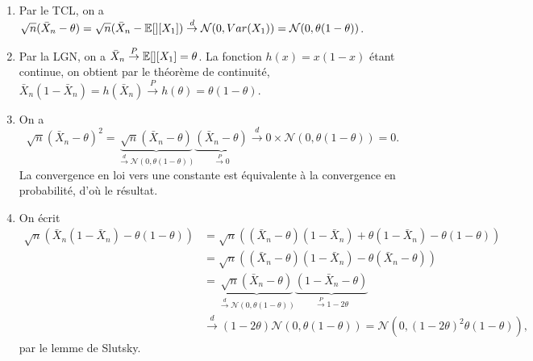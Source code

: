\begin{solution}
  \begin{enumerate}
    \item Par le TCL, on a $\sqrt{n} ( \bar{X}_n - \theta)=\sqrt{n} ( \bar{X}_n -
            \mathbb{E}[][X_1]) \overset{d}{\rightarrow} \mathcal N(0,Var(X_1))=\mathcal N
            (0,\theta(1-\theta))$.
    \item Par la LGN, on a $\bar{X}_n \overset{P}{\rightarrow}\mathbb{E}[][X_1]=\theta$.
          La fonction $h(x)=x(1-x)$ \'etant continue, on obtient par le th\'eor\`eme de
          continuit\'e, $\bar{X}_n(1-\bar{X}_n)=h(\bar{X}_n)\overset{P}{\rightarrow}
            h(\theta)=\theta(1-\theta)$.
    \item On a $$\sqrt{n} ( \bar{X}_n - \theta)^2= \underbrace{\sqrt{n} ( \bar{X}_n -
              \theta)}_{\overset{d}{\rightarrow} \mathcal N
              (0,\theta(1-\theta))}\underbrace{( \bar{X}_n -
              \theta)}_{\overset{P}{\rightarrow} 0} \overset{d}{\rightarrow} 0\times \mathcal
            N (0,\theta(1-\theta))=0. $$ La convergence en loi vers une constante est
          \'equivalente \`a la convergence en probabilit\'e, d'o\`u le r\'esultat.
    \item On \'ecrit
          \begin{align*}
            \sqrt{n} \left( \bar{X}_n (1 - \bar{X}_n) - \theta(1-\theta) \right)
             & = \sqrt{n} \left( (\bar{X}_n-\theta) (1 - \bar{X}_n)+\theta(1 - \bar{X}_n) - \theta(1-\theta) \right)                                                                            \\
             & = \sqrt{n} \left( (\bar{X}_n-\theta) (1 - \bar{X}_n)-\theta( \bar{X}_n -\theta) \right)                                                                                          \\
             & = \underbrace{\sqrt{n}   (\bar{X}_n-\theta)}_{\overset{d}{\rightarrow} \mathcal N (0,\theta(1-\theta))} \underbrace{(1 - \bar{X}_n-\theta)}_{\overset{P}{\rightarrow} 1-2\theta} \\
             & \overset{d}{\rightarrow} (1-2\theta) \mathcal N (0,\theta(1-\theta))= \mathcal N (0,(1-2\theta)^2\theta(1-\theta)),
          \end{align*}
          par le lemme de Slutsky.
  \end{enumerate}
\end{solution}

